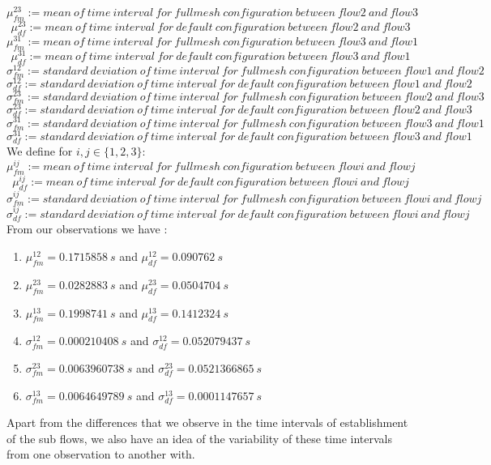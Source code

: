 \documentclass[a4paper,11pt]{article}
\begin{document}
			$$\mu_{fm}^{23} := mean\ of\ time\ interval\ for\ fullmesh\ configuration\ between\ flow2\ and\ flow3$$ 
			$$\mu_{df}^{23} := mean\ of\ time\ interval\ for\ default\ configuration\ between\ flow2\ and\ flow3$$
			$$\mu_{fm}^{31} := mean\ of\ time\ interval\ for\ fullmesh\ configuration\ between\ flow3\ and\ flow1$$ 
			$$\mu_{df}^{31} := mean\ of\ time\ interval\ for\ default\ configuration\ between\ flow3\ and\ flow1$$
			$$\sigma_{fm}^{12} := standard\ deviation\ of\ time\ interval\ for\ fullmesh\ configuration\ between\ flow1\ and\ flow2$$
			$$\sigma_{df}^{12} := standard\ deviation\ of\ time\ interval\ for\ default\ configuration\ between\ flow1\ and\ flow2$$
			$$\sigma_{fm}^{23} := standard\ deviation\ of\ time\ interval\ for\ fullmesh\ configuration\ between\ flow2\ and\ flow3$$
			$$\sigma_{df}^{23} := standard\ deviation\ of\ time\ interval\ for\ default\ configuration\ between\ flow2\ and\ flow3$$
			$$\sigma_{fm}^{31} := standard\ deviation\ of\ time\ interval\ for\ fullmesh\ configuration\ between\ flow3\ and\ flow1$$
			$$\sigma_{df}^{31} := standard\ deviation\ of\ time\ interval\ for\ default\ configuration\ between\ flow3\ and\ flow1$$
			\fi
			We define for $i,j \in \{1, 2, 3\}$:
			$$\mu_{fm}^{ij} := mean\ of\ time\ interval\ for\ fullmesh\ configuration\ between\ flowi\ and\ flowj$$ 
			$$\mu_{df}^{ij} := mean\ of\ time\ interval\ for\ default\ configuration\ between\ flowi\ and\ flowj$$
			$$\sigma_{fm}^{ij} := standard\ deviation\ of\ time\ interval\ for\ fullmesh\ configuration\ between\ flowi\ and\ flowj$$
			$$\sigma_{df}^{ij} := standard\ deviation\ of\ time\ interval\ for\ default\ configuration\ between\ flowi\ and\ flowj$$
			From our observations we have :
			\begin{enumerate}
				\item $\mu_{fm}^{12} = 0.1715858\ s$ and $\mu_{df}^{12} = 0.090762\ s$
				\item $\mu_{fm}^{23} = 0.0282883\ s$ and $\mu_{df}^{23} = 0.0504704\ s$
				\item $\mu_{fm}^{13} = 0.1998741\ s$ and $\mu_{df}^{13} = 0.1412324\ s$ \\
				\item $\sigma_{fm}^{12} = 0.000210408\ s$ and $\sigma_{df}^{12} = 0.052079437\ s$
				\item $\sigma_{fm}^{23} = 0.0063960738\ s$ and $\sigma_{df}^{23} = 0.0521366865\ s$
				\item $\sigma_{fm}^{13} = 0.0064649789\ s$ and $\sigma_{df}^{13} = 0.0001147657\ s$
			\end{enumerate}
			Apart from the differences that we observe in the time intervals of establishment of the sub flows, we also have an idea of the variability of these time intervals from one observation to another with.
\end{document}
